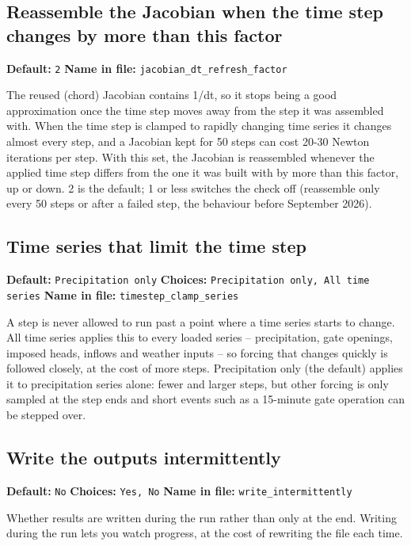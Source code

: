 \documentclass[11pt]{article}
\begin{document}
\subsection{Reassemble the Jacobian when the time step changes by more than this factor}
{\small \textbf{Default:} \texttt{2} \quad\textbullet\quad \textbf{Name in file:} \texttt{jacobian\_\allowbreak{}dt\_\allowbreak{}refresh\_\allowbreak{}factor}}

The reused (chord) Jacobian contains 1/dt, so it stops being a good approximation once the time step moves away from the step it was assembled with. When the time step is clamped to rapidly changing time series it changes almost every step, and a Jacobian kept for 50 steps can cost 20-30 Newton iterations per step. With this set, the Jacobian is reassembled whenever the applied time step differs from the one it was built with by more than this factor, up or down. 2 is the default; 1 or less switches the check off (reassemble only every 50 steps or after a failed step, the behaviour before September 2026).
\subsection{Time series that limit the time step}
{\small \textbf{Default:} \texttt{Precipitation only} \quad\textbullet\quad \textbf{Choices:} \texttt{Precipitation only, All time series} \quad\textbullet\quad \textbf{Name in file:} \texttt{timestep\_\allowbreak{}clamp\_\allowbreak{}series}}

A step is never allowed to run past a point where a time series starts to change. All time series applies this to every loaded series -- precipitation, gate openings, imposed heads, inflows and weather inputs -- so forcing that changes quickly is followed closely, at the cost of more steps. Precipitation only (the default) applies it to precipitation series alone: fewer and larger steps, but other forcing is only sampled at the step ends and short events such as a 15-minute gate operation can be stepped over.
\subsection{Write the outputs intermittently}
{\small \textbf{Default:} \texttt{No} \quad\textbullet\quad \textbf{Choices:} \texttt{Yes, No} \quad\textbullet\quad \textbf{Name in file:} \texttt{write\_\allowbreak{}intermittently}}

Whether results are written during the run rather than only at the end. Writing during the run lets you watch progress, at the cost of rewriting the file each time.
\end{document}

